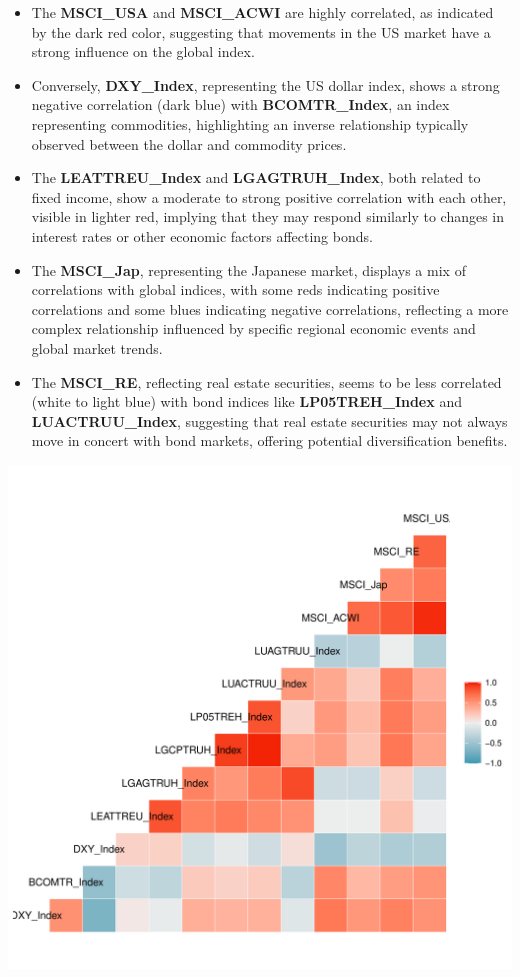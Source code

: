 \documentclass[11pt,preprint, authoryear]{elsarticle}
\numberwithin{equation}{section}
\numberwithin{figure}{section}
\numberwithin{table}{section}
\def\tightlist{} %
\begin{document}
\begin{itemize}
\tightlist
\item
  The \textbf{MSCI\_USA} and \textbf{MSCI\_ACWI} are highly correlated,
  as indicated by the dark red color, suggesting that movements in the
  US market have a strong influence on the global index.
\item
  Conversely, \textbf{DXY\_Index}, representing the US dollar index,
  shows a strong negative correlation (dark blue) with
  \textbf{BCOMTR\_Index}, an index representing commodities,
  highlighting an inverse relationship typically observed between the
  dollar and commodity prices.
\item
  The \textbf{LEATTREU\_Index} and \textbf{LGAGTRUH\_Index}, both
  related to fixed income, show a moderate to strong positive
  correlation with each other, visible in lighter red, implying that
  they may respond similarly to changes in interest rates or other
  economic factors affecting bonds.
\item
  The \textbf{MSCI\_Jap}, representing the Japanese market, displays a
  mix of correlations with global indices, with some reds indicating
  positive correlations and some blues indicating negative correlations,
  reflecting a more complex relationship influenced by specific regional
  economic events and global market trends.
\item
  The \textbf{MSCI\_RE}, reflecting real estate securities, seems to be
  less correlated (white to light blue) with bond indices like
  \textbf{LP05TREH\_Index} and \textbf{LUACTRUU\_Index}, suggesting that
  real estate securities may not always move in concert with bond
  markets, offering potential diversification benefits.
\end{itemize}

\includegraphics{Question-6_files/figure-latex/corrplot-1.pdf}
\end{document}
